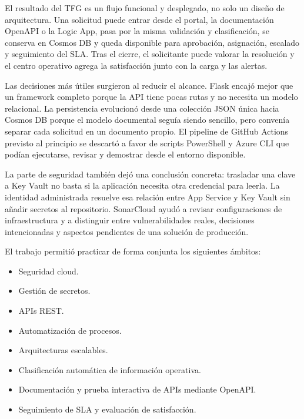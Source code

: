 
El resultado del TFG es un flujo funcional y desplegado, no solo un diseño de arquitectura. Una solicitud puede entrar desde el portal, la documentación OpenAPI o la Logic App, pasa por la misma validación y clasificación, se conserva en Cosmos DB y queda disponible para aprobación, asignación, escalado y seguimiento del SLA. Tras el cierre, el solicitante puede valorar la resolución y el centro operativo agrega la satisfacción junto con la carga y las alertas.

Las decisiones más útiles surgieron al reducir el alcance. Flask encajó mejor que un framework completo porque la API tiene pocas rutas y no necesita un modelo relacional. La persistencia evolucionó desde una colección JSON única hacia Cosmos DB porque el modelo documental seguía siendo sencillo, pero convenía separar cada solicitud en un documento propio. El pipeline de GitHub Actions previsto al principio se descartó a favor de scripts PowerShell y Azure CLI que podían ejecutarse, revisar y demostrar desde el entorno disponible.

La parte de seguridad también dejó una conclusión concreta: trasladar una clave a Key Vault no basta si la aplicación necesita otra credencial para leerla. La identidad administrada resuelve esa relación entre App Service y Key Vault sin añadir secretos al repositorio. SonarCloud ayudó a revisar configuraciones de infraestructura y a distinguir entre vulnerabilidades reales, decisiones intencionadas y aspectos pendientes de una solución de producción.

El trabajo permitió practicar de forma conjunta los siguientes ámbitos:

\begin{itemize}
    \item Seguridad cloud.
    \item Gestión de secretos.
    \item APIs REST.
    \item Automatización de procesos.
    \item Arquitecturas escalables.
    \item Clasificación automática de información operativa.
    \item Documentación y prueba interactiva de APIs mediante OpenAPI.
    \item Seguimiento de SLA y evaluación de satisfacción.
\end{itemize}

